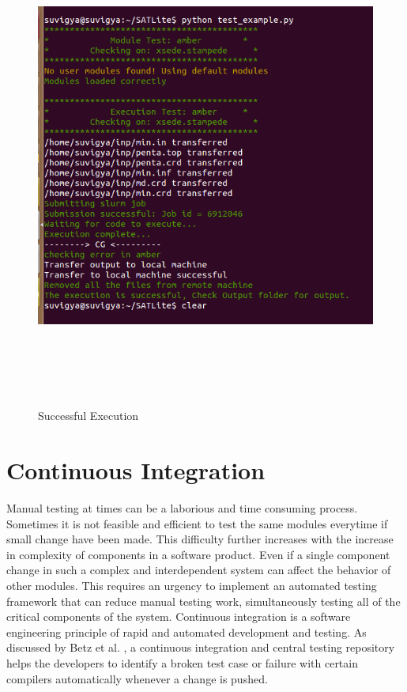 \documentclass[10pt]{ruthesis}
\begin{document}
\begin{figure}
  \begin{center}
  \includegraphics[width=15cm,height=16cm]{success.png}
  \caption{Successful Execution}
  \label{fig:success}
  \end{center}
\end{figure}


\chapter{Continuous Integration}
Manual testing at times can be a laborious and time consuming process. Sometimes it is not feasible and efficient to test the same modules everytime if small change have been made. This difficulty further increases with the increase in complexity of components in a software product. Even if a single component change in such a complex and interdependent system can affect the behavior of other modules. This requires an urgency to implement an automated testing framework that can reduce manual testing work, simultaneously testing all of the critical components of the system. Continuous integration is a software engineering principle of rapid and automated development and testing. As discussed by Betz et al. \cite{ref16}, a continuous integration and central testing repository helps the developers to identify a broken test case or failure with certain compilers automatically whenever a change is pushed.
\end{document}

